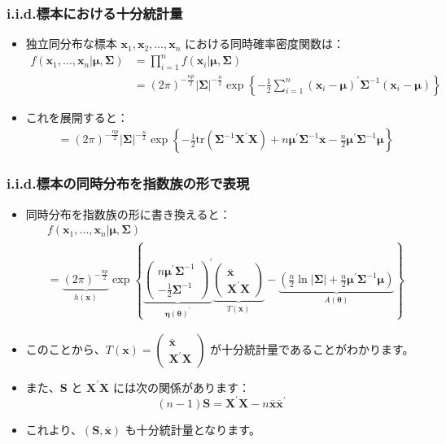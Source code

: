 \documentclass{beamer}
\begin{document}
\begin{frame}
\frametitle{i.i.d.標本における十分統計量}
\begin{itemize}
    \item 独立同分布な標本 $\bm{x}_1, \bm{x}_2, \ldots, \bm{x}_n$ における同時確率密度関数は：
    \begin{align*}
    f(\bm{x}_1,\ldots,\bm{x}_n|\bm{\mu},\bm{\Sigma}) &= \prod_{i=1}^{n}f(\bm{x}_i|\bm{\mu},\bm{\Sigma}) \\
    &= (2\pi)^{-\frac{np}{2}}|\bm{\Sigma}|^{-\frac{n}{2}}\exp\left\{-\frac{1}{2}\sum_{i=1}^{n}(\bm{x}_i-\bm{\mu})^{\prime}\bm{\Sigma}^{-1}(\bm{x}_i-\bm{\mu})\right\}
    \end{align*}
    \item これを展開すると：
    \begin{align*}
    &= (2\pi)^{-\frac{np}{2}}|\bm{\Sigma}|^{-\frac{n}{2}}\exp\left\{-\frac{1}{2}\mathrm{tr}(\bm{\Sigma}^{-1}\bm{X}^{\prime}\bm{X})+n\bm{\mu}^{\prime}\bm{\Sigma}^{-1}\overline{\bm{x}}-\frac{n}{2}\bm{\mu}^{\prime}\bm{\Sigma}^{-1}\bm{\mu}\right\}
    \end{align*}
\end{itemize}
\end{frame}

\begin{frame}
\frametitle{i.i.d.標本の同時分布を指数族の形で表現}
\begin{itemize}
    \item 同時分布を指数族の形に書き換えると：
    \begin{align*}
    &f(\bm{x}_1,\ldots,\bm{x}_n|\bm{\mu},\bm{\Sigma}) \\
    &= \underbrace{(2\pi)^{-\frac{np}{2}}}_{h(\bm{x})}\exp\left\{\underbrace{\begin{pmatrix}n\bm{\mu}^{\prime}\bm{\Sigma}^{-1} \\ -\frac{1}{2}\bm{\Sigma}^{-1}\end{pmatrix}^{\prime}}_{\bm{\eta}(\bm{\theta})^{\prime}}\underbrace{\begin{pmatrix}\overline{\bm{x}} \\ \bm{X}^{\prime}\bm{X}\end{pmatrix}}_{T(\bm{x})}-\underbrace{\left(\frac{n}{2}\ln|\bm{\Sigma}|+\frac{n}{2}\bm{\mu}^{\prime}\bm{\Sigma}^{-1}\bm{\mu}\right)}_{A(\bm{\theta})}\right\}
    \end{align*}
    \item このことから、$T(\bm{x})=\begin{pmatrix}\overline{\bm{x}} \\ \bm{X}^{\prime}\bm{X}\end{pmatrix}$ が十分統計量であることがわかります。
    \item また、$\bm{S}$ と $\bm{X}^{\prime}\bm{X}$ には次の関係があります：
    \[
    (n-1)\bm{S} = \bm{X}^{\prime}\bm{X} - n\overline{\bm{x}}\overline{\bm{x}}^{\prime}
    \]
    \item これより、$(\bm{S},\overline{\bm{x}})$ も十分統計量となります。
\end{itemize}
\end{frame}
\end{document}
